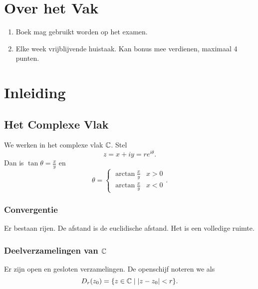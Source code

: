 
\setcounter{chapter}{-1}
\chapter{Over het Vak} \label{chap:over_het_vak}

\begin{enumerate}
	\item Boek mag gebruikt worden op het examen.
	\item Elke week vrijblijvende huistaak. Kan bonus mee verdienen, maximaal 4 punten.
\end{enumerate}

\chapter{Inleiding} \label{chap:inleiding}
\section{Het Complexe Vlak} \label{sec:het_complexe_vlak}

We werken in het complexe vlak $\mathbb{C}$. 
Stel \[
z = x + iy = re^{i\theta}
.\] 
Dan is $\tan \theta = \frac{x}{y}$ en \[
\theta = \begin{cases}
	\arctan \frac{x}{y} & x>0\\
	\arctan \frac{x}{y} & x < 0
\end{cases}
.\] 

\subsection{Convergentie} \label{sec:convergentie}
Er bestaan rijen. De afstand is de euclidische afstand.
Het is een volledige ruimte.

\subsection{Deelverzamelingen van $\mathbb{C}$} \label{sec:deelverzamelingen_van_c}
Er zijn open en gesloten verzamelingen. De openschijf noteren we als \[
	D_r(z_0) = \{z \in \mathbb{C} \;|\; |z - z_0| < r\} 
.\]

